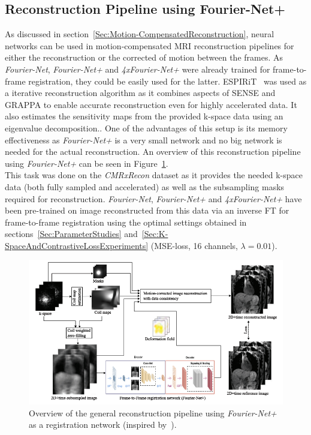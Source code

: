\documentclass[english,version-2022-01]{uzl-thesis} %
\begin{document}
\subsection{Reconstruction Pipeline using Fourier-Net+}
As discussed in section~\ref{Sec:Motion-CompensatedReconstruction}, neural networks can be used in motion-compensated MRI reconstruction pipelines for either the reconstruction or the corrected of motion between the frames. As \emph{Fourier-Net}, \emph{Fourier-Net+} and \emph{4xFourier-Net+} were already trained for frame-to-frame registration, they could be easily used for the latter. ESPIRiT~\cite{ESPIRiT} was used as a iterative reconstruction algorithm as it combines aspects of SENSE and GRAPPA to enable accurate reconstruction even for highly accelerated data. It also estimates the sensitivity maps from the provided k-space data using an eigenvalue decomposition.. One of the advantages of this setup is its memory effectiveness as \emph{Fourier-Net+} is a very small network and no big network is needed for the actual reconstruction. An overview of this reconstruction pipeline using \emph{Fourier-Net+} can be seen in Figure~\ref{fig:ReconstructionPipeline}. \\ 
This task was done on the \emph{CMRxRecon} dataset as it provides the needed k-space data (both fully sampled and accelerated) as well as the subsampling masks required for reconstruction. \emph{Fourier-Net}, \emph{Fourier-Net+} and \emph{4xFourier-Net+} have been pre-trained on image reconstructed from this data via an inverse FT for frame-to-frame registration using the optimal settings obtained in sections~\ref{Sec:ParameterStudies} and~\ref{Sec:K-SpaceAndContrastiveLossExperiments} (MSE-loss, 16 channels, $\lambda=0.01$).

\begin{figure}[htpb]
	\centering
	\graphicspath{{images/}{\main/images/}}
	\includegraphics[width=\linewidth]{ReconstructionPipelineCompact.png} 
	\caption{Overview of the general reconstruction pipeline using \emph{Fourier-Net+} as a registration network (inspired by~\cite{Kuestner2022}).}
	\label{fig:ReconstructionPipeline}
\end{figure}
\end{document}

